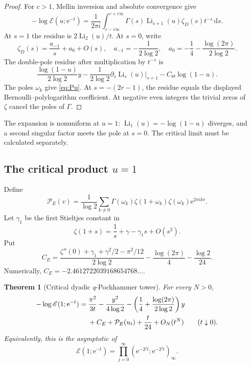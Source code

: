 \documentclass[11pt,oneside]{article}
\numberwithin{equation}{section}
\theoremstyle{plain}
\newtheorem{theorem}{Theorem}[section]
\theoremstyle{definition}
\theoremstyle{remark}
\newcommand{\Li}{\operatorname{Li}}
\newcommand{\dd}{\,\mathrm{d}}
\newcommand{\Ecal}{\mathscr E}
\newcommand{\Pcal}{\mathcal P}
\newcommand{\e}{\mathrm e}
\begin{document}
\begin{proof}
For $c>1$, Mellin inversion and absolute convergence give
\begin{equation}\label{eq:E-Mellin}
 -\log\Ecal(u;\e^{-t})
 =\frac1{2\pi i}\int_{c-i\infty}^{c+i\infty}
 \Gamma(s)\Li_{s+1}(u)\zeta_D(s)t^{-s}\dd s.
\end{equation}
At $s=1$ the residue is $2\Li_2(u)/t$.  At $s=0$, write
\[
 \zeta_D(s)=\frac{a_{-1}}s+a_0+O(s),
 \quad
 a_{-1}=-\frac1{2\log2},
 \quad
 a_0=-\frac14-\frac{\log(2\pi)}{2\log2}.
\]
The double-pole residue after multiplication by $t^{-s}$ is
\[
 \frac{\log(1-u)}{2\log2}y
 -\frac1{2\log2}\left.\partial_s\Li_s(u)\right|_{s=1}
 -C_\Theta\log(1-u).
\]
The poles $\omega_k$ give \cref{eq:Pu}.  At $s=-(2r-1)$, the residue equals the displayed Bernoulli--polylogarithm coefficient.  At negative even integers the trivial zeros of $\zeta$ cancel the poles of $\Gamma$.
\end{proof}

The expansion is nonuniform at $u=1$: $\Li_1(u)=-\log(1-u)$ diverges, and a second singular factor meets the pole at $s=0$.  The critical limit must be calculated separately.

\subsection{The critical product $u=1$}

Define
\begin{equation}\label{eq:PE}
 \Pcal_E(v)=\frac1{\log2}
 \sum_{k\ne0}\Gamma(\omega_k)\zeta(1+\omega_k)
 \zeta(\omega_k)\e^{2\pi ikv}.
\end{equation}
Let $\gamma_1$ be the first Stieltjes constant in
\[
 \zeta(1+s)=\frac1s+\gamma-\gamma_1s+O(s^2).
\]
Put
\begin{equation}\label{eq:CE}
 C_E=
 \frac{\zeta''(0)+\gamma_1+\gamma^2/2-\pi^2/12}{2\log2}
 -\frac{\log(2\pi)}4-\frac{\log2}{24}.
\end{equation}
Numerically, $C_E=-2.4612722039168654768\ldots$.

\begin{theorem}[Critical dyadic $q$-Pochhammer tower]\label{thm:E-critical}
For every $N>0$,
\begin{align}\label{eq:E-critical-asymp}
 -\log\Ecal(1;\e^{-t})
 ={}&\frac{\pi^2}{3t}
 -\frac{y^2}{4\log2}
 -\left(\frac14+\frac{\log(2\pi)}{2\log2}\right)y\\
 &+C_E+\Pcal_E(u_t)+\frac{t}{24}+O_N(t^N)
 \qquad(t\downarrow0).\notag
\end{align}
Equivalently, this is the asymptotic of
\begin{equation}\label{eq:E1-tower}
 \Ecal(1;\e^{-t})
 =\prod_{j=0}^{\infty}
 (\e^{-2^jt};\e^{-2^jt})_\infty.
\end{equation}
\end{theorem}
\end{document}
